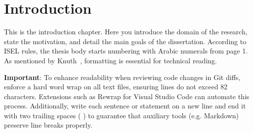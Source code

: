 \chapter{Introduction}

This is the introduction chapter. Here you introduce the domain of the research,
state the motivation, and detail the main goals of the dissertation.  
According to ISEL rules, the thesis body starts numbering with Arabic numerals
from page 1.  
As mentioned by Knuth~\cite{knuth1984tex}, formatting is essential for technical
reading.  

\textbf{Important}: To enhance readability when reviewing code changes in Git
diffs, enforce a hard word wrap on all text files, ensuring lines do not exceed
82 characters.  
Extensions such as Rewrap for Visual Studio Code can automate this process.  
Additionally, write each sentence or statement on a new line and end it with two
trailing spaces (  ) to guarantee that auxiliary tools (e.g. Markdown) preserve
line breaks properly.  


